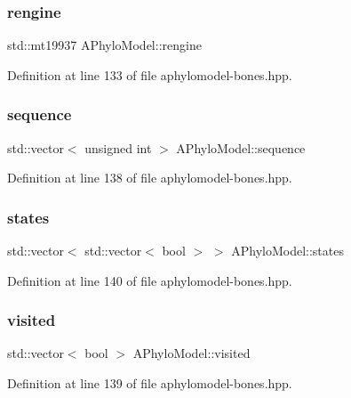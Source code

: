 \subsubsection{\texorpdfstring{rengine}{rengine}}
{\footnotesize\ttfamily std\+::mt19937 A\+Phylo\+Model\+::rengine}



Definition at line 133 of file aphylomodel-\/bones.\+hpp.

\mbox{\label{class_a_phylo_model_a5f15ec301385244387c9be5290f5ee28}} 
\subsubsection{\texorpdfstring{sequence}{sequence}}
{\footnotesize\ttfamily std\+::vector$<$ unsigned int $>$ A\+Phylo\+Model\+::sequence}



Definition at line 138 of file aphylomodel-\/bones.\+hpp.

\mbox{\label{class_a_phylo_model_aa6a0a51491c065588bb3504d9b84540c}} 
\subsubsection{\texorpdfstring{states}{states}}
{\footnotesize\ttfamily std\+::vector$<$ std\+::vector$<$ bool $>$ $>$ A\+Phylo\+Model\+::states}



Definition at line 140 of file aphylomodel-\/bones.\+hpp.

\mbox{\label{class_a_phylo_model_ac98b6767ff0c32b30caf23dbf6810578}} 
\subsubsection{\texorpdfstring{visited}{visited}}
{\footnotesize\ttfamily std\+::vector$<$ bool $>$ A\+Phylo\+Model\+::visited}



Definition at line 139 of file aphylomodel-\/bones.\+hpp.



